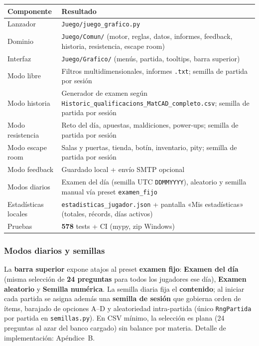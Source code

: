 \documentclass[11pt,a4paper]{article}
\begin{document}
\begin{tabular}{@{}lp{8cm}@{}}
\toprule
\textbf{Componente} & \textbf{Resultado} \\
\midrule
Lanzador & \texttt{Juego/juego\_grafico.py} \\
Dominio & \texttt{Juego/Comun/} (motor, reglas, datos, informes, feedback, historia, resistencia, escape room) \\
Interfaz & \texttt{Juego/Grafico/} (menús, partida, tooltips, barra superior) \\
Modo libre & Filtros multidimensionales, informes \texttt{.txt}; semilla de partida por sesión \\
Modo historia & Generador de examen según \texttt{Historic\_qualificacions\_MatCAD\_completo.csv}; semilla de partida por sesión \\
Modo resistencia & Reto del día, apuestas, maldiciones, power-ups; semilla de partida por sesión \\
Modo escape room & Salas y puertas, tienda, botín, inventario, pity; semilla de partida por sesión \\
Modo feedback & Guardado local + envío SMTP opcional \\
Modos diarios & Examen del día (semilla UTC \texttt{DDMMYYYY}), aleatorio y semilla manual vía preset \texttt{examen\_fijo} \\
Estadísticas locales & \texttt{estadisticas\_jugador.json} + pantalla «Mis estadísticas» (totales, récords, días activos) \\
Pruebas & \textbf{578} tests + CI (mypy, zip Windows) \\
\bottomrule
\end{tabular}

\subsubsection{Modos diarios y semillas}

La \textbf{barra superior} expone atajos al preset \textbf{examen fijo}: \textbf{Examen del día} (misma selección de \textbf{24 preguntas} para todos los jugadores ese día), \textbf{Examen aleatorio} y \textbf{Semilla numérica}. La semilla diaria fija el \textbf{contenido}; al iniciar cada partida se asigna además una \textbf{semilla de sesión} que gobierna orden de ítems, barajado de opciones A--D y aleatoriedad intra-partida (único \texttt{RngPartida} por partida en \texttt{semillas.py}). En CSV mínimo, la selección es plana (24 preguntas al azar del banco cargado) sin balance por materia. Detalle de implementación: Apéndice~B.
\end{document}
